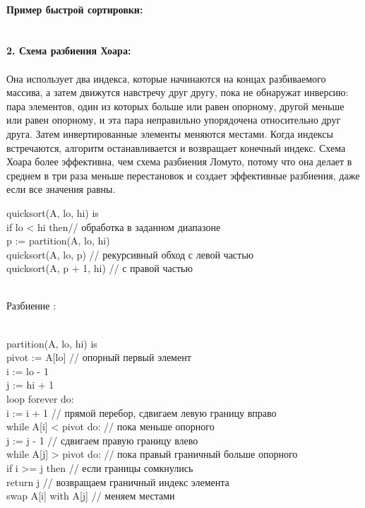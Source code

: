 \\
\textbf{Пример быстрой сортировки:}\\
\\
\\
\textbf{2. Схема разбиения Хоара:}\\
\\
Она использует два индекса, которые начинаются на концах разбиваемого массива, а затем движутся навстречу друг другу, пока не обнаружат инверсию: пара элементов, один из которых больше или равен опорному, другой меньше или равен опорному, и эта пара неправильно упорядочена относительно друг друга. Затем инвертированные элементы меняются местами. Когда индексы встречаются, алгоритм останавливается и возвращает конечный индекс. Схема Хоара более эффективна, чем схема разбиения Ломуто, потому что она делает в среднем в три раза меньше перестановок и создает эффективные разбиения, даже если все значения равны.\\
\begin{tcolorbox}[breakable,enhanced,before upper={\parindent10pt}]
\noindent quicksort(A, lo, hi) is\\
if lo < hi then// обработка в заданном диапазоне\\
\indent p := partition(A, lo, hi)\\
\indent quicksort(A, lo, p) // рекурсивный обход с левой частью\\
\indent quicksort(A, p + 1, hi) // с правой частью\\
\end{tcolorbox}
\\
Разбиение :\\
\\
\begin{tcolorbox}[breakable,enhanced,before upper={\parindent10pt}]
\noindent partition(A, lo, hi) is\\
pivot := A[lo] // опорный первый элемент\\
i := lo - 1\\
j := hi + 1\\
loop forever do:\\
\indent i := i + 1 // прямой перебор, сдвигаем левую границу вправо\\
\indent while A[i] < pivot do:  // пока меньше опорного\\
\indent\indent j := j - 1 // сдвигаем правую границу влево\\
\indent while A[j] > pivot do: // пока правый граничный больше опорного \\
\indent\indent if i >= j then // если границы сомкнулись\\
\indent\indent\indent return j // возвращаем граничный индекс элемента\\
\indent swap A[i] with A[j] // меняем местами\\
\end{tcolorbox}

